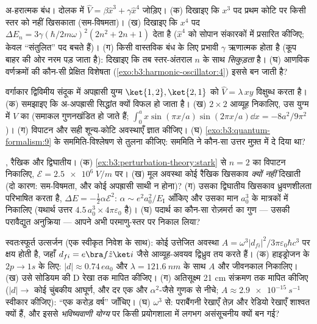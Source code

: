 \begin{exercise}[$\star\star$]\label{exo:b3:perturbation-theory:5}
अ-हरात्मक बंध। दोलक में $\hat V = \beta\hat x^3 + \gamma\hat x^4$
जोड़िए। (क) दिखाइए कि $x^3$ पद प्रथम कोटि पर किसी स्तर को नहीं खिसकाता
(सम-विषमता)। (ख) दिखाइए कि $x^4$ पद $\Delta E_n =
3\gamma(\hbar/2m\omega)^2(2n^2 + 2n + 1)$ देता है ($\hat x^4$ को
सोपान संकारकों में प्रसारित कीजिए; केवल ``संतुलित'' पद बचते हैं)। (ग) किसी वास्तविक बंध के लिए प्रभावी $\gamma$ ऋणात्मक होता है (कूप
बाहर की ओर नरम पड़ जाता है): दिखाइए कि तब स्तर-अंतराल $n$ के साथ
\emph{सिकुड़ता} है।
(घ) आणविक वर्णक्रमों की कौन-सी प्रेक्षित विशेषता
(\cref{exo:b3:harmonic-oscillator:4}) इससे बन जाती है?
\end{exercise}

\begin{exercise}[$\star\star$]\label{exo:b3:perturbation-theory:6}
वर्गाकार द्विविमीय संदूक में अपह्रासी युग्म $\ket{1,2},
\ket{2,1}$ को $\hat V = \lambda\,xy$ विक्षुब्ध करता है। (क) समझाइए कि
अ-अपह्रासी सिद्धांत क्यों विफल हो जाता है। (ख) $2\times2$ आव्यूह
निकालिए, उस युग्म में $\hat V$ का (समाकल गुणनखंडित हो जाते हैं; $\int_0^a
x\sin(\pi x/a)\sin(2\pi x/a)\dd x = -8a^2/9\pi^2$)। (ग)
विपाटन और सही शून्य-कोटि अवस्थाएँ ज्ञात कीजिए। (घ)
\cref{exo:b3:quantum-formalism:9} के सममिति-विश्लेषण से तुलना कीजिए:
सममिति ने कौन-सा उत्तर मुफ़्त में दे दिया था?
\end{exercise}

\begin{exercise}[$\star\star$]\label{exo:b3:perturbation-theory:7}
, रैखिक और द्विघातीय। (क)
\cref{ex:b3:perturbation-theory:stark} से $n = 2$ का विपाटन निकालिए,
$\mathcal E = \qty{2.5e6}{V/m}$ पर। (ख) मूल अवस्था कोई रैखिक खिसकाव
\emph{क्यों नहीं} दिखाती (दो कारण: सम-विषमता, और
कोई अपह्रासी साथी न होना)? (ग) उसका द्विघातीय खिसकाव ध्रुवणशीलता
परिभाषित करता है, $\Delta E = -\tfrac12\alpha\mathcal E^2$:
$\alpha \sim e^2a_0^2/E_{\text{I}}$ आँकिए और उसका मान
$a_0^3$ के मात्रकों में निकालिए (यथार्थ उत्तर $4.5\,a_0^3 \times
4\pi\varepsilon_0$ है)। (घ) पदार्थ का कौन-सा रोज़मर्रा का गुण ---
उसकी परावैद्युत अनुक्रिया --- आपने अभी परमाणु-स्तर पर निकाल लिया?
\end{exercise}

\begin{exercise}[$\star\star$]\label{exo:b3:perturbation-theory:8}
स्वतःस्फूर्त उत्सर्जन (एक स्वीकृत निवेश के साथ): कोई उत्तेजित अवस्था
$A = \omega^3|d_{fi}|^2/3\pi\varepsilon_0\hbar c^3$ पर क्षय होती है,
जहाँ $d_{fi} = e\bra f\hat z\ket i$ जैसे आव्यूह-अवयव
द्विध्रुव तय करते हैं। (क) हाइड्रोजन के $2p \to 1s$ के लिए: $|d| \approx 0.74\,
ea_0$ और $\lambda = \qty{121.6}{nm}$ के साथ $A$ और
जीवनकाल निकालिए। (ख) उसे सोडियम की D रेखा तक मापित कीजिए। (ग)
अतिसूक्ष्म 21 cm संक्रमण तक मापित कीजिए ($|d| \to$ कोई चुंबकीय आघूर्ण,
और दर एक और $\alpha^2$-जैसे गुणक से नीचे; $A \approx
\qty{2.9e-15}{s^{-1}}$ स्वीकार कीजिए): ``एक करोड़ वर्ष'' जाँचिए। (घ)
$\omega^3$ से: पराबैंगनी रेखाएँ तेज़ और रेडियो रेखाएँ शाश्वत क्यों हैं,
और इससे 
\emph{भविष्यवाणी योग्य} पर किसी प्रयोगशाला में लगभग असंसूचनीय क्यों बन गई?
\end{exercise}

